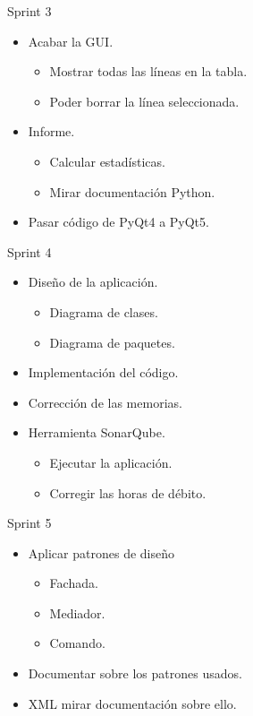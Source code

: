 Sprint 3 
\begin{itemize}
	\item Acabar la GUI.
		\begin{itemize}
			\item Mostrar todas las líneas en la tabla.
			\item Poder borrar la línea seleccionada.
		\end{itemize} 
	\item Informe.
		\begin{itemize}
			\item Calcular estadísticas.
			\item Mirar documentación Python.
		\end{itemize}
	\item Pasar código de PyQt4 a PyQt5.
\end{itemize}


Sprint 4
\begin{itemize}
	\item Diseño de la aplicación.
		\begin{itemize}
			\item Diagrama de clases.
			\item Diagrama de paquetes.
		\end{itemize}
		
	\item Implementación del código.
		
	\item Corrección de las memorias.
	
	\item Herramienta SonarQube.
	\begin{itemize}
		\item Ejecutar la aplicación.
		\item Corregir las horas de débito.
	\end{itemize}
\end{itemize}



Sprint 5
\begin{itemize}
	\item Aplicar patrones de diseño
	\begin{itemize}
		\item Fachada.
		\item Mediador.
		\item Comando.
	\end{itemize}
	\item Documentar sobre los patrones usados.
	\item XML mirar documentación sobre ello.
\end{itemize}



